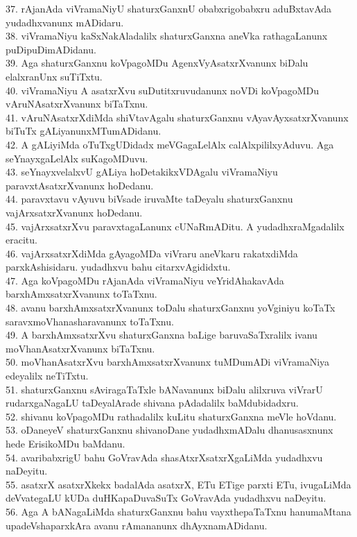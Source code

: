 \documentclass{article}
\begin{document}
37. rAjanAda viVramaNiyU shaturxGanxnU obabxrigobabxru aduBxtavAda yudadhxvanunx mADidaru.\\
38. viVramaNiyu kaSxNakAladalilx shaturxGanxna aneVka rathagaLanunx puDipuDimADidanu.\\
39. Aga shaturxGanxnu koVpagoMDu AgenxVyAsatxrXvanunx biDalu elalxranUnx suTiTxtu.\\
40. viVramaNiyu A asatxrXvu suDutitxruvudanunx noVDi koVpagoMDu vAruNAsatxrXvanunx biTaTxnu.\\
41. vAruNAsatxrXdiMda shiVtavAgalu shaturxGanxnu vAyavAyxsatxrXvanunx biTuTx gALiyanunxMTumADidanu.\\
42. A gALiyiMda oTuTxgUDidadx meVGagaLelAlx calAlxpililxyAduvu. Aga seYnayxgaLelAlx suKagoMDuvu.\\
43. seYnayxvelalxvU gALiya hoDetakikxVDAgalu viVramaNiyu paravxtAsatxrXvanunx hoDedanu.\\
44. paravxtavu vAyuvu biVsade iruvaMte taDeyalu shaturxGanxnu vajArxsatxrXvanunx hoDedanu.\\
45. vajArxsatxrXvu paravxtagaLanunx cUNaRmADitu. A yudadhxraMgadalilx eracitu.\\
46. vajArxsatxrXdiMda gAyagoMDa viVraru aneVkaru rakatxdiMda parxkAshisidaru. yudadhxvu bahu citarxvAgididxtu.\\
47. Aga koVpagoMDu rAjanAda viVramaNiyu veYridAhakavAda barxhAmxsatxrXvanunx toTaTxnu.\\
48. avanu barxhAmxsatxrXvanunx toDalu shaturxGanxnu yoVginiyu koTaTx saravxmoVhanasharavanunx toTaTxnu.\\
49. A barxhAmxsatxrXvu shaturxGanxna baLige baruvaSaTxralilx ivanu moVhanAsatxrXvanunx biTaTxnu.\\
50. moVhanAsatxrXvu barxhAmxsatxrXvanunx tuMDumADi viVramaNiya edeyalilx neTiTxtu.\\
51. shaturxGanxnu sAviragaTaTxle bANavanunx biDalu alilxruva viVrarU rudarxgaNagaLU taDeyalArade shivana pAdadalilx baMdubidadxru.\\
52. shivanu koVpagoMDu rathadalilx kuLitu shaturxGanxna meVle hoVdanu.\\
53. oDaneyeV shaturxGanxnu shivanoDane yudadhxmADalu dhanusasxnunx hede ErisikoMDu baMdanu.\\
54. avaribabxrigU bahu GoVravAda shasAtxrXsatxrXgaLiMda yudadhxvu naDeyitu.\\
55. asatxrX asatxrXkekx badalAda asatxrX, ETu ETige parxti ETu, ivugaLiMda deVvategaLU kUDa duHKapaDuvaSuTx GoVravAda yudadhxvu naDeyitu.\\
56. Aga A bANagaLiMda shaturxGanxnu bahu vayxthepaTaTxnu hanumaMtana upadeVshaparxkAra avanu rAmananunx dhAyxnamADidanu.\\
\end{document}
